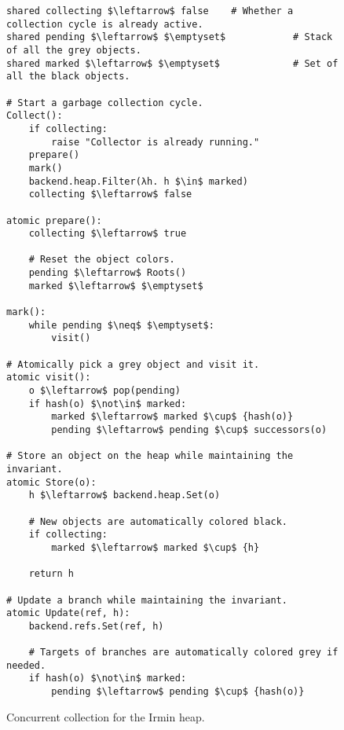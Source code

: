 \begin{figure}[!ht]
  \caption{Concurrent collection for the Irmin heap.}
  \label{alg:concurrent-collection}

  \centering
  \begin{lstlisting}
shared collecting $\leftarrow$ false    # Whether a collection cycle is already active.
shared pending $\leftarrow$ $\emptyset$            # Stack of all the grey objects.
shared marked $\leftarrow$ $\emptyset$             # Set of all the black objects.

# Start a garbage collection cycle.
Collect():
    if collecting:
        raise "Collector is already running."
    prepare()
    mark()
    backend.heap.Filter(λh. h $\in$ marked)
    collecting $\leftarrow$ false

atomic prepare():
    collecting $\leftarrow$ true

    # Reset the object colors.
    pending $\leftarrow$ Roots()
    marked $\leftarrow$ $\emptyset$

mark():
    while pending $\neq$ $\emptyset$:
        visit()

# Atomically pick a grey object and visit it.
atomic visit():
    o $\leftarrow$ pop(pending)
    if hash(o) $\not\in$ marked:
        marked $\leftarrow$ marked $\cup$ {hash(o)}
        pending $\leftarrow$ pending $\cup$ successors(o)

# Store an object on the heap while maintaining the invariant.
atomic Store(o):
    h $\leftarrow$ backend.heap.Set(o)

    # New objects are automatically colored black.
    if collecting:
        marked $\leftarrow$ marked $\cup$ {h}

    return h

# Update a branch while maintaining the invariant.
atomic Update(ref, h):
    backend.refs.Set(ref, h)

    # Targets of branches are automatically colored grey if needed.
    if hash(o) $\not\in$ marked:
        pending $\leftarrow$ pending $\cup$ {hash(o)}
\end{lstlisting}
\end{figure}
